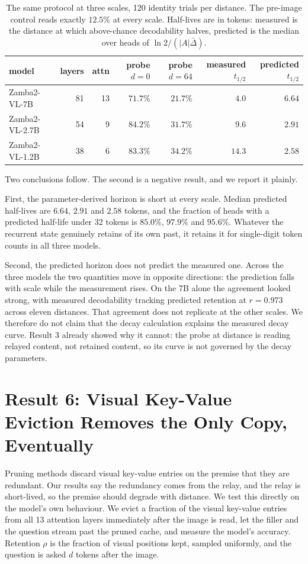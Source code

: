 \documentclass[10pt]{article}
\begin{document}
\begin{table}[h]
\centering\small
\begin{tabular}{lrrrrrr}
\toprule
model & layers & attn & probe $d{=}0$ & probe $d{=}64$ & measured $t_{1/2}$ & predicted $t_{1/2}$ \\
\midrule
Zamba2-VL-7B   & 81 & 13 & $71.7\%$ & $21.7\%$ & $4.0$  & $6.64$ \\
Zamba2-VL-2.7B & 54 &  9 & $84.2\%$ & $31.7\%$ & $9.6$  & $2.91$ \\
Zamba2-VL-1.2B & 38 &  6 & $83.3\%$ & $34.2\%$ & $14.3$ & $2.58$ \\
\bottomrule
\end{tabular}
\caption{The same protocol at three scales, 120 identity trials per distance.
The pre-image control reads exactly $12.5\%$ at every scale. Half-lives are in
tokens: measured is the distance at which above-chance decodability halves,
predicted is the median over heads of $\ln 2/(|A|\bar{\Delta})$.}
\label{tab:scale}
\end{table}

Two conclusions follow. The second is a negative result, and we report it
plainly.

First, the parameter-derived horizon is short at every scale. Median predicted
half-lives are $6.64$, $2.91$ and $2.58$ tokens, and the fraction of heads
with a predicted half-life under 32 tokens is $85.0\%$, $97.9\%$ and $95.6\%$.
Whatever the recurrent state genuinely retains of its own past, it retains it
for single-digit token counts in all three models.

Second, the predicted horizon does not predict the measured one. Across the
three models the two quantities move in opposite directions: the prediction
falls with scale while the measurement rises. On the 7B alone the agreement
looked strong, with measured decodability tracking predicted retention at
$r = 0.973$ across eleven distances. That agreement does not replicate at the
other scales. We therefore do not claim that the decay calculation explains
the measured decay curve. Result 3 already showed why it cannot: the probe at
distance is reading relayed content, not retained content, so its curve is not
governed by the decay parameters.

\section{Result 6: Visual Key-Value Eviction Removes the Only Copy, Eventually}

Pruning methods discard visual key-value entries on the premise that they are
redundant. Our results say the redundancy comes from the relay, and the relay
is short-lived, so the premise should degrade with distance. We test this
directly on the model's own behaviour. We evict a fraction of the visual
key-value entries from all 13 attention layers immediately after the image is
read, let the filler and the question stream past the pruned cache, and
measure the model's accuracy. Retention $\rho$ is the fraction of visual
positions kept, sampled uniformly, and the question is asked $d$ tokens after
the image.
\end{document}
